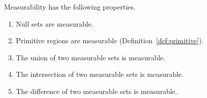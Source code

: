 \begin{lemma}[measurable]\label{lemma:measurable}
Measurability has the following properties.
\begin{enumerate}%
\item Null sets are measurable.
\item Primitive regions are measurable (Definition~\ref{def:primitive}).
\item The union of two measurable sets is measurable.
\item The intersection of two measurable sets is measurable.
\item The difference of two measurable sets is measurable.
\label{enum:measure}
%
%
%
\end{enumerate}
\end{lemma}


